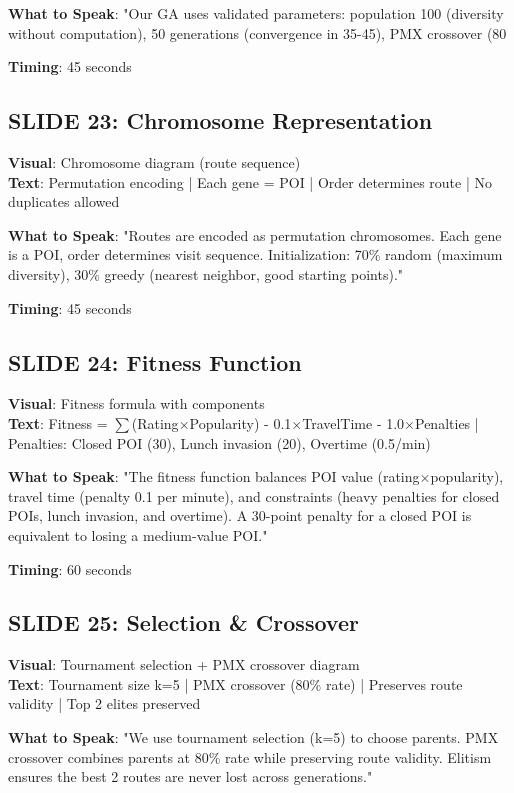 \documentclass[12pt]{article}
\begin{document}
\textbf{What to Speak}:
"Our GA uses validated parameters: population 100 (diversity without computation), 50 generations (convergence in 35-45), PMX crossover (80%

\textbf{Timing}: 45 seconds

\subsection{SLIDE 23: Chromosome Representation}
\textbf{Visual}: Chromosome diagram (route sequence) \\
\textbf{Text}: Permutation encoding | Each gene = POI | Order determines route | No duplicates allowed

\textbf{What to Speak}:
"Routes are encoded as permutation chromosomes. Each gene is a POI, order determines visit sequence. Initialization: 70\% random (maximum diversity), 30\% greedy (nearest neighbor, good starting points)."

\textbf{Timing}: 45 seconds

\subsection{SLIDE 24: Fitness Function}
\textbf{Visual}: Fitness formula with components \\
\textbf{Text}: Fitness = $\sum$(Rating$\times$Popularity) - 0.1$\times$TravelTime - 1.0$\times$Penalties | Penalties: Closed POI (30), Lunch invasion (20), Overtime (0.5/min)

\textbf{What to Speak}:
"The fitness function balances POI value (rating$\times$popularity), travel time (penalty 0.1 per minute), and constraints (heavy penalties for closed POIs, lunch invasion, and overtime). A 30-point penalty for a closed POI is equivalent to losing a medium-value POI."

\textbf{Timing}: 60 seconds

\subsection{SLIDE 25: Selection \& Crossover}
\textbf{Visual}: Tournament selection + PMX crossover diagram \\
\textbf{Text}: Tournament size k=5 | PMX crossover (80\% rate) | Preserves route validity | Top 2 elites preserved

\textbf{What to Speak}:
"We use tournament selection (k=5) to choose parents. PMX crossover combines parents at 80\% rate while preserving route validity. Elitism ensures the best 2 routes are never lost across generations."
\end{document}

